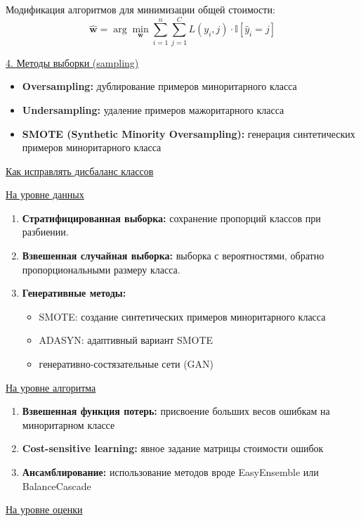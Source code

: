 Модификация алгоритмов для минимизации общей стоимости:
\[ \hat{\bm{w}} = \arg\min_{\bm{w}} \sum_{i=1}^n \sum_{j=1}^C L(y_i, j) \cdot \mathbb{I}[\hat{y}_i = j] \]

\underline{4. Методы выборки (sampling)}

\begin{itemize}
    \item \textbf{Oversampling:} дублирование примеров миноритарного класса
    \item \textbf{Undersampling:} удаление примеров мажоритарного класса
    \item \textbf{SMOTE (Synthetic Minority Oversampling):} генерация синтетических примеров миноритарного класса
\end{itemize}

\underline{Как исправлять дисбаланс классов}

\underline{На уровне данных}

\begin{enumerate}
    \item \textbf{Стратифицированная выборка:} сохранение пропорций классов при разбиении.
    \item \textbf{Взвешенная случайная выборка:} выборка с вероятностями, обратно пропорциональными размеру класса.
    \item \textbf{Генеративные методы:}
    \begin{itemize}
        \item SMOTE: создание синтетических примеров миноритарного класса
        \item ADASYN: адаптивный вариант SMOTE
        \item генеративно-состязательные сети (GAN)
    \end{itemize}
\end{enumerate}

\underline{На уровне алгоритма}

\begin{enumerate}
    \item \textbf{Взвешенная функция потерь:} присвоение больших весов ошибкам на миноритарном классе
    \item \textbf{Cost-sensitive learning:} явное задание матрицы стоимости ошибок
    \item \textbf{Ансамблирование:} использование методов вроде EasyEnsemble или BalanceCascade
\end{enumerate}

\underline{На уровне оценки}

